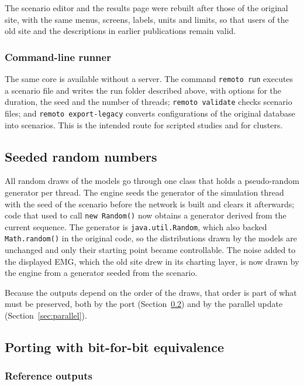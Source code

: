 \documentclass[pdflatex,sn-apa,iicol]{sn-jnl}
\providecommand{\code}[1]{\texttt{#1}}
\begin{document}
The scenario editor and the results page were rebuilt after those of the original site, with the same menus, screens, labels, units and limits, so that users of the old site and the descriptions in earlier publications remain valid.

\subsubsection{Command-line runner}\label{sec:cli}

The same core is available without a server. The command \code{remoto run} executes a scenario file and writes the run folder described above, with options for the duration, the seed and the number of threads; \code{remoto validate} checks scenario files; and \code{remoto export-legacy} converts configurations of the original database into scenarios. This is the intended route for scripted studies and for clusters.

\subsection{Seeded random numbers}\label{sec:rng}

All random draws of the models go through one class that holds a pseudo-random generator per thread. The engine seeds the generator of the simulation thread with the seed of the scenario before the network is built and clears it afterwards; code that used to call \code{new Random()} now obtains a generator derived from the current sequence. The generator is \code{java.util.Random}, which also backed \code{Math.random()} in the original code, so the distributions drawn by the models are unchanged and only their starting point became controllable. The noise added to the displayed EMG, which the old site drew in its charting layer, is now drawn by the engine from a generator seeded from the scenario.

Because the outputs depend on the order of the draws, that order is part of what must be preserved, both by the port (Section~\ref{sec:port}) and by the parallel update (Section~\ref{sec:parallel}).

\subsection{Porting with bit-for-bit equivalence}\label{sec:port}

\subsubsection{Reference outputs}\label{sec:golden}
\end{document}
